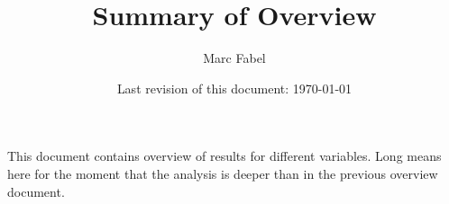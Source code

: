 \documentclass[11pt, a4paper]{scrartcl} %
\author{Marc Fabel}
\title{Summary of Overview}
\date{Last revision of this document: \today}
\begin{document}
\maketitle
This document contains overview of results for different variables. Long means here for the moment that the analysis is deeper than in the previous overview document.

\begin{landscape}



















\end{landscape}
\end{document}
